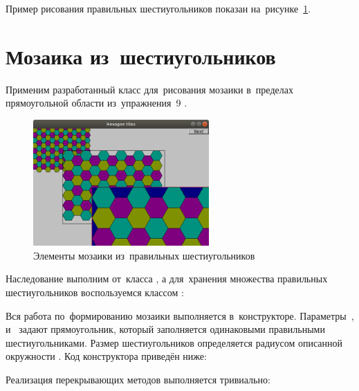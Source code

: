 
Пример рисования правильных шестиугольников показан на~рисунке~\ref{fig:regularhexagon}.



\section{Мозаика из~шестиугольников}
Применим разработанный класс  для~рисования мозаики в~пределах прямоугольной области из~упражнения~9 .

\begin{figure}[ht]
    {\centering
        \includegraphics[width=0.6\textwidth]{images/hexagon_tiles.png}

    }
    \caption{Элементы мозаики из~правильных шестиугольников}
    \label{fig:regularhexagon}
\end{figure}

Наследование выполним от~класса , а для~хранения множества правильных шестиугольников воспользуемся классом :


Вся работа по~формированию мозаики выполняется в~конструкторе. Параметры~,  и~ задают прямоугольник, который заполняется одинаковыми правильными шестиугольниками. Размер шестиугольников определяется радиусом описанной окружности . Код конструктора приведён ниже:


Реализация перекрывающих методов выполняется тривиально:


